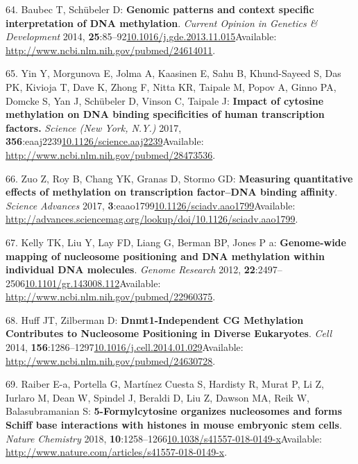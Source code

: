 \documentclass[
]{book}
\begin{document}
\leavevmode\hypertarget{ref-Baubec2014}{}%
64. Baubec T, Schübeler D: \textbf{Genomic patterns and context specific interpretation of DNA methylation}. \emph{Current Opinion in Genetics \& Development} 2014, \textbf{25}:85--92\href{https://doi.org/10.1016/j.gde.2013.11.015}{10.1016/j.gde.2013.11.015}Available: \url{http://www.ncbi.nlm.nih.gov/pubmed/24614011}.

\leavevmode\hypertarget{ref-Yin2017}{}%
65. Yin Y, Morgunova E, Jolma A, Kaasinen E, Sahu B, Khund-Sayeed S, Das PK, Kivioja T, Dave K, Zhong F, Nitta KR, Taipale M, Popov A, Ginno PA, Domcke S, Yan J, Schübeler D, Vinson C, Taipale J: \textbf{Impact of cytosine methylation on DNA binding specificities of human transcription factors.} \emph{Science (New York, N.Y.)} 2017, \textbf{356}:eaaj2239\href{https://doi.org/10.1126/science.aaj2239}{10.1126/science.aaj2239}Available: \url{http://www.ncbi.nlm.nih.gov/pubmed/28473536}.

\leavevmode\hypertarget{ref-Zuo2017}{}%
66. Zuo Z, Roy B, Chang YK, Granas D, Stormo GD: \textbf{Measuring quantitative effects of methylation on transcription factor--DNA binding affinity}. \emph{Science Advances} 2017, \textbf{3}:eaao1799\href{https://doi.org/10.1126/sciadv.aao1799}{10.1126/sciadv.aao1799}Available: \url{http://advances.sciencemag.org/lookup/doi/10.1126/sciadv.aao1799}.

\leavevmode\hypertarget{ref-Kelly2012}{}%
67. Kelly TK, Liu Y, Lay FD, Liang G, Berman BP, Jones P a: \textbf{Genome-wide mapping of nucleosome positioning and DNA methylation within individual DNA molecules}. \emph{Genome Research} 2012, \textbf{22}:2497--2506\href{https://doi.org/10.1101/gr.143008.112}{10.1101/gr.143008.112}Available: \url{http://www.ncbi.nlm.nih.gov/pubmed/22960375}.

\leavevmode\hypertarget{ref-Huff2014}{}%
68. Huff JT, Zilberman D: \textbf{Dnmt1-Independent CG Methylation Contributes to Nucleosome Positioning in Diverse Eukaryotes}. \emph{Cell} 2014, \textbf{156}:1286--1297\href{https://doi.org/10.1016/j.cell.2014.01.029}{10.1016/j.cell.2014.01.029}Available: \url{http://www.ncbi.nlm.nih.gov/pubmed/24630728}.

\leavevmode\hypertarget{ref-Raiber2017}{}%
69. Raiber E-a, Portella G, Martínez Cuesta S, Hardisty R, Murat P, Li Z, Iurlaro M, Dean W, Spindel J, Beraldi D, Liu Z, Dawson MA, Reik W, Balasubramanian S: \textbf{5-Formylcytosine organizes nucleosomes and forms Schiff base interactions with histones in mouse embryonic stem cells}. \emph{Nature Chemistry} 2018, \textbf{10}:1258--1266\href{https://doi.org/10.1038/s41557-018-0149-x}{10.1038/s41557-018-0149-x}Available: \url{http://www.nature.com/articles/s41557-018-0149-x}.
\end{document}
